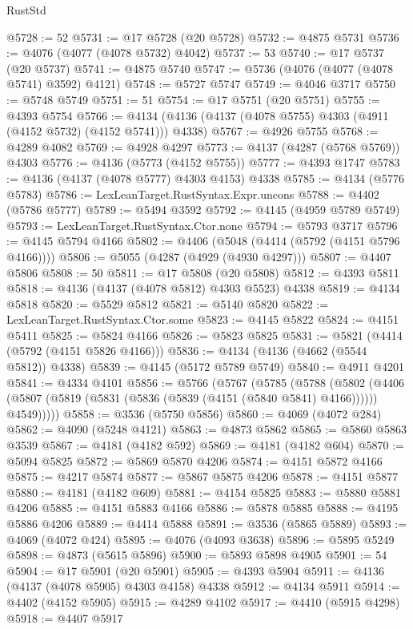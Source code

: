 \begin{lexlean}{RustStd}
\begin{coremodule}
@5728 := 52
@5731 := @17 @5728 (@20 @5728)
@5732 := @4875 @5731
@5736 := @4076 (@4077 (@4078 @5732) @4042)
@5737 := 53
@5740 := @17 @5737 (@20 @5737)
@5741 := @4875 @5740
@5747 := @5736 (@4076 (@4077 (@4078 @5741) @3592) @4121)
@5748 := @5727 @5747
@5749 := @4046 @3717
@5750 := @5748 @5749
@5751 := 51
@5754 := @17 @5751 (@20 @5751)
@5755 := @4393 @5754
@5766 := @4134 (@4136 (@4137 (@4078 @5755) @4303 (@4911 (@4152 @5732) (@4152 @5741))) @4338)
@5767 := @4926 @5755
@5768 := @4289 @4082
@5769 := @4928 @4297
@5773 := @4137 (@4287 (@5768 @5769)) @4303
@5776 := @4136 (@5773 (@4152 @5755))
@5777 := @4393 @1747
@5783 := @4136 (@4137 (@4078 @5777) @4303 @4153) @4338
@5785 := @4134 (@5776 @5783)
@5786 := LexLeanTarget.RustSyntax.Expr.uncons
@5788 := @4402 (@5786 @5777)
@5789 := @5494 @3592
@5792 := @4145 (@4959 @5789 @5749)
@5793 := LexLeanTarget.RustSyntax.Ctor.none
@5794 := @5793 @3717
@5796 := @4145 @5794 @4166
@5802 := @4406 (@5048 (@4414 (@5792 (@4151 @5796 @4166))))
@5806 := @5055 (@4287 (@4929 (@4930 @4297)))
@5807 := @4407 @5806
@5808 := 50
@5811 := @17 @5808 (@20 @5808)
@5812 := @4393 @5811
@5818 := @4136 (@4137 (@4078 @5812) @4303 @5523) @4338
@5819 := @4134 @5818
@5820 := @5529 @5812
@5821 := @5140 @5820
@5822 := LexLeanTarget.RustSyntax.Ctor.some
@5823 := @4145 @5822
@5824 := @4151 @5411
@5825 := @5824 @4166
@5826 := @5823 @5825
@5831 := @5821 (@4414 (@5792 (@4151 @5826 @4166)))
@5836 := @4134 (@4136 (@4662 (@5544 @5812)) @4338)
@5839 := @4145 (@5172 @5789 @5749)
@5840 := @4911 @4201
@5841 := @4334 @4101
@5856 := @5766
    (@5767
      (@5785
        (@5788
          (@5802
            (@4406 (@5807 (@5819 (@5831 (@5836 (@5839 (@4151 (@5840 @5841) @4166)))))) @4549)))))
@5858 := @3536 (@5750 @5856)
@5860 := @4069 (@4072 @284)
@5862 := @4090 (@5248 @4121)
@5863 := @4873 @5862
@5865 := @5860 @5863 @3539
@5867 := @4181 (@4182 @592)
@5869 := @4181 (@4182 @604)
@5870 := @5094 @5825
@5872 := @5869 @5870 @4206
@5874 := @4151 @5872 @4166
@5875 := @4217 @5874
@5877 := @5867 @5875 @4206
@5878 := @4151 @5877
@5880 := @4181 (@4182 @609)
@5881 := @4154 @5825
@5883 := @5880 @5881 @4206
@5885 := @4151 @5883 @4166
@5886 := @5878 @5885
@5888 := @4195 @5886 @4206
@5889 := @4414 @5888
@5891 := @3536 (@5865 @5889)
@5893 := @4069 (@4072 @424)
@5895 := @4076 (@4093 @3638)
@5896 := @5895 @5249
@5898 := @4873 (@5615 @5896)
@5900 := @5893 @5898 @4905
@5901 := 54
@5904 := @17 @5901 (@20 @5901)
@5905 := @4393 @5904
@5911 := @4136 (@4137 (@4078 @5905) @4303 @4158) @4338
@5912 := @4134 @5911
@5914 := @4402 (@4152 @5905)
@5915 := @4289 @4102
@5917 := @4410 (@5915 @4298)
@5918 := @4407 @5917

\end{coremodule}
\end{lexlean}
